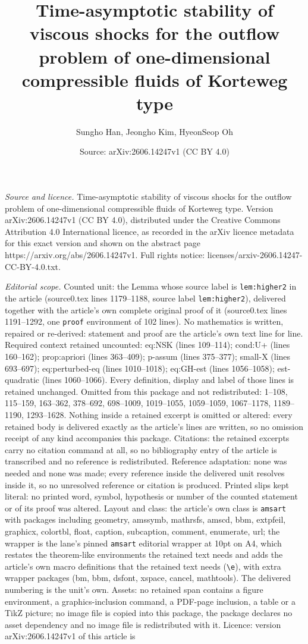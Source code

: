 \documentclass[10pt,a4paper]{amsart}
\title[Time-asymptotic stability of viscous shocks for the outflow ]{Time-asymptotic stability of viscous shocks for the outflow problem of one-dimensional compressible fluids of Korteweg type}
\author{Sungho Han, Jeongho Kim, HyeonSeop Oh}
\date{Source: arXiv:2606.14247v1 (CC BY 4.0)}
\begin{document}
\maketitle

\noindent\emph{Source and licence.} Time-asymptotic stability of viscous shocks for the outflow problem of one-dimensional compressible fluids of Korteweg type. Version arXiv:2606.14247v1 (CC BY 4.0), distributed under the Creative Commons Attribution 4.0 International licence, as recorded in the arXiv licence metadata for this exact version and shown on the abstract page https://arxiv.org/abs/2606.14247v1. Full rights notice: licenses/arxiv-2606.14247-CC-BY-4.0.txt.\par\smallskip

\noindent\textit{Editorial scope.} Counted unit: the Lemma whose source label is \texttt{lem:higher2} in the article (source0.tex lines 1179--1188, source label \texttt{lem:higher2}), delivered together with the article's own complete original proof of it (source0.tex lines 1191--1292, one \texttt{proof} environment of 102 lines). No mathematics is written, repaired or re-derived: statement and proof are the article's own text line for line. Required context retained uncounted: eq:NSK (lines 109--114); cond:U+ (lines 160--162); prop:apriori (lines 363--409); p-assum (lines 375--377); small-X (lines 693--697); eq:perturbed-eq (lines 1010--1018); eq:GH-est (lines 1056--1058); est-quadratic (lines 1060--1066). Every definition, display and label of those lines is retained unchanged. Omitted from this package and not redistributed: 1--108, 115--159, 163--362, 378--692, 698--1009, 1019--1055, 1059--1059, 1067--1178, 1189--1190, 1293--1628. Nothing inside a retained excerpt is omitted or altered: every retained body is delivered exactly as the article's lines are written, so no omission receipt of any kind accompanies this package. Citations: the retained excerpts carry no citation command at all, so no bibliography entry of the article is transcribed and no reference is redistributed. Reference adaptation: none was needed and none was made; every reference inside the delivered unit resolves inside it, so no unresolved reference or citation is produced. Printed slips kept literal: no printed word, symbol, hypothesis or number of the counted statement or of its proof was altered. Layout and class: the article's own class is \texttt{amsart} with packages including geometry, amssymb, mathrsfs, amscd, bbm, extpfeil, graphicx, colortbl, float, caption, subcaption, comment, enumerate, url; the wrapper is the lane's pinned \texttt{amsart} editorial wrapper at 10pt on A4, which restates the theorem-like environments the retained text needs and adds the article's own macro definitions that the retained text needs (\texttt{\textbackslash e}), with extra wrapper packages (bm, bbm, dsfont, xspace, cancel, mathtools). The delivered numbering is the unit's own. Assets: no retained span contains a figure environment, a graphics-inclusion command, a PDF-page inclusion, a table or a TikZ picture; no image file is copied into this package, the package declares no asset dependency and no image file is redistributed with it. Licence: version arXiv:2606.14247v1 of this article is 
\end{document}
